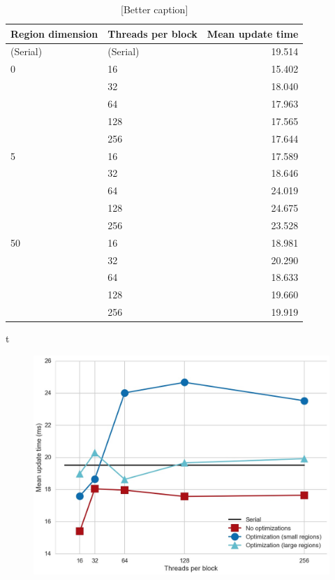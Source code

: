 \documentclass[12pt]{article}
\begin{document}
    \begin{table}
        \centering
        \begin{tabular}{llr}
            \toprule
            Region dimension & Threads per block & Mean update time \\ \midrule
            (Serial)  & (Serial)   &  19.514 \\
            0  & 16  &  15.402 \\
            & 32  &  18.040 \\
            & 64  &  17.963 \\
            & 128 &  17.565 \\
            & 256 &  17.644 \\ \midrule
            5  & 16  &  17.589 \\
            & 32  &  18.646 \\
            & 64  &  24.019 \\
            & 128 &  24.675 \\
            & 256 &  23.528 \\ \midrule
            50 & 16  &  18.981 \\
            & 32  &  20.290 \\
            & 64  &  18.633 \\
            & 128 &  19.660 \\
            & 256 & 19.919 \\ \bottomrule
        \end{tabular}
        \caption{[Better caption]}
        \label{tab:means} t
    \end{table}
    
    \begin{figure}[t]
        \centering
        \includegraphics[width=\textwidth]{../images/plot.jpg}
        \caption{}
        \label{fig:means}
    \end{figure}
    
\end{document}
